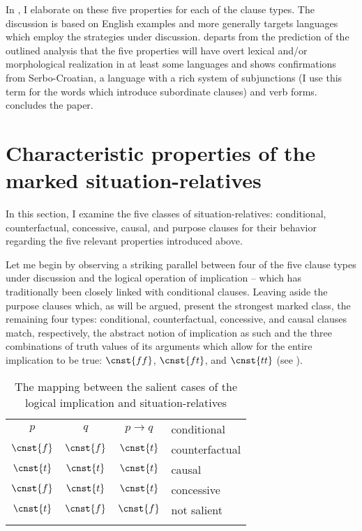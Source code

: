 \documentclass[output=paper,
colorlinks,
citecolor=brown,
newtxmath
]{langscibook}
\begin{document}
In , I elaborate on these five properties for each of the clause types. The discussion is based on English examples and more generally targets languages which employ the strategies under discussion.  departs from the prediction of the outlined analysis that the five properties will have overt lexical and/or morphological realization in at least some languages and shows confirmations from Serbo-Croatian, a language with a rich system of subjunctions (I use this term for the words which introduce subordinate clauses) and verb forms.  concludes the paper.


\section{Characteristic properties of the marked situation-relatives}\label{sec:Properties}

In this section, I examine the five classes of situation-relatives: conditional, counterfactual, concessive, causal, and purpose clauses for their behavior regarding the five relevant properties introduced above.

Let me begin by observing a striking parallel between four of the five clause types under discussion and the logical operation of implication -- which has traditionally been closely linked with conditional clauses. Leaving aside the purpose clauses which, as will be argued, present the strongest marked class, the remaining four types: conditional, counterfactual, concessive, and causal clauses match, respectively, the abstract notion of implication as such and the three combinations of truth values of its arguments which allow for the entire implication to be true: $\cnst{ff}$, $\cnst{ft}$, and $\cnst{tt}$ (see ).

\begin{table}
\centering
\begin{tabularx}{.45\textwidth}{cccX}
    \lsptoprule
    $p$ & $q$ & $p\rightarrow q$ & conditional \\
    $\cnst{f}$ & $\cnst{f}$ & $\cnst{t}$ & counterfactual \\
    $\cnst{t}$ & $\cnst{t}$ & $\cnst{t}$ & causal \\
    $\cnst{f}$ & $\cnst{t}$ & $\cnst{t}$ & concessive \\
    \textcolor{lsDOIGray}{$\cnst{t}$} & \textcolor{lsDOIGray}{$\cnst{f}$} & \textcolor{lsDOIGray}{$\cnst{f}$} & not salient\\
    \lspbottomrule
\end{tabularx}
\caption{The mapping between the salient cases of the logical implication and situation-relatives}
\label{tab:Implic}
\end{table}
\end{document}
